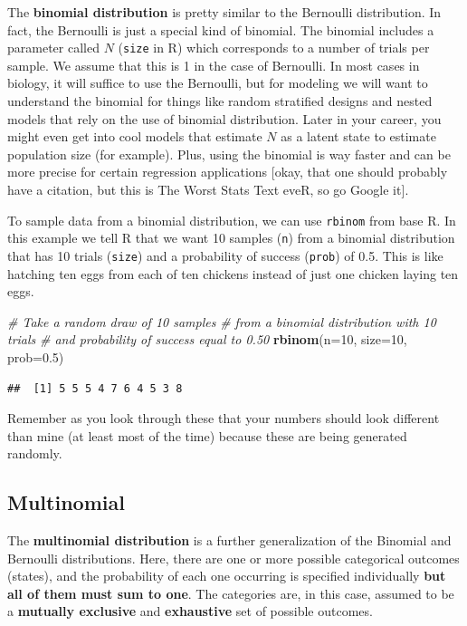 \documentclass[
]{book}
\newenvironment{Shaded}{\begin{snugshade}}{\end{snugshade}}
\newcommand{\CommentTok}[1]{\textcolor[rgb]{0.56,0.35,0.01}{\textit{#1}}}
\newcommand{\DataTypeTok}[1]{\textcolor[rgb]{0.13,0.29,0.53}{#1}}
\newcommand{\DecValTok}[1]{\textcolor[rgb]{0.00,0.00,0.81}{#1}}
\newcommand{\FloatTok}[1]{\textcolor[rgb]{0.00,0.00,0.81}{#1}}
\newcommand{\KeywordTok}[1]{\textcolor[rgb]{0.13,0.29,0.53}{\textbf{#1}}}
\newcommand{\NormalTok}[1]{#1}
\begin{document}
The \textbf{binomial distribution} is pretty similar to the Bernoulli distribution. In fact, the Bernoulli is just a special kind of binomial. The binomial includes a parameter called \(N\) (\texttt{size} in R) which corresponds to a number of trials per sample. We assume that this is 1 in the case of Bernoulli. In most cases in biology, it will suffice to use the Bernoulli, but for modeling we will want to understand the binomial for things like random stratified designs and nested models that rely on the use of binomial distribution. Later in your career, you might even get into cool models that estimate \(N\) as a latent state to estimate population size (for example). Plus, using the binomial is way faster and can be more precise for certain regression applications {[}okay, that one should probably have a citation, but this is The Worst Stats Text eveR, so go Google it{]}.

To sample data from a binomial distribution, we can use \texttt{rbinom} from base R. In this example we tell R that we want 10 samples (\texttt{n}) from a binomial distribution that has 10 trials (\texttt{size}) and a probability of success (\texttt{prob}) of 0.5. This is like hatching ten eggs from each of ten chickens instead of just one chicken laying ten eggs.

\begin{Shaded}
\begin{Highlighting}[]
\CommentTok{# Take a random draw of 10 samples}
\CommentTok{# from a binomial distribution with 10 trials}
\CommentTok{# and probability of success equal to 0.50}
\KeywordTok{rbinom}\NormalTok{(}\DataTypeTok{n=}\DecValTok{10}\NormalTok{, }\DataTypeTok{size=}\DecValTok{10}\NormalTok{, }\DataTypeTok{prob=}\FloatTok{0.5}\NormalTok{)}
\end{Highlighting}
\end{Shaded}

\begin{verbatim}
##  [1] 5 5 5 4 7 6 4 5 3 8
\end{verbatim}

Remember as you look through these that your numbers should look different than mine (at least most of the time) because these are being generated randomly.

\hypertarget{multinomial}{%
\subsection{Multinomial}\label{multinomial}}

The \textbf{multinomial distribution} is a further generalization of the Binomial and Bernoulli distributions. Here, there are one or more possible categorical outcomes (states), and the probability of each one occurring is specified individually \textbf{but all of them must sum to one}. The categories are, in this case, assumed to be a \textbf{mutually exclusive} and \textbf{exhaustive} set of possible outcomes.
\end{document}
